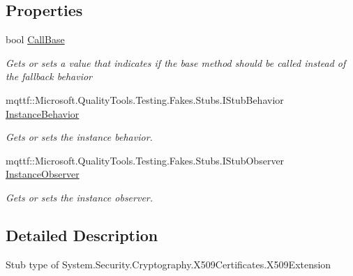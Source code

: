 \subsection*{Properties}
\begin{DoxyCompactItemize}
\item 
bool \hyperlink{class_system_1_1_security_1_1_cryptography_1_1_x509_certificates_1_1_fakes_1_1_stub_x509_extension_a73b4e3047842f780e43cd7a33bc94b4f}{Call\-Base}
\begin{DoxyCompactList}\small\item\em Gets or sets a value that indicates if the base method should be called instead of the fallback behavior\end{DoxyCompactList}\item 
mqttf\-::\-Microsoft.\-Quality\-Tools.\-Testing.\-Fakes.\-Stubs.\-I\-Stub\-Behavior \hyperlink{class_system_1_1_security_1_1_cryptography_1_1_x509_certificates_1_1_fakes_1_1_stub_x509_extension_ab302c65cf78e3fadf1862c6eda6de0cc}{Instance\-Behavior}
\begin{DoxyCompactList}\small\item\em Gets or sets the instance behavior.\end{DoxyCompactList}\item 
mqttf\-::\-Microsoft.\-Quality\-Tools.\-Testing.\-Fakes.\-Stubs.\-I\-Stub\-Observer \hyperlink{class_system_1_1_security_1_1_cryptography_1_1_x509_certificates_1_1_fakes_1_1_stub_x509_extension_a38baeb6a5fff8d1a8f5f1f84d4d07e5c}{Instance\-Observer}
\begin{DoxyCompactList}\small\item\em Gets or sets the instance observer.\end{DoxyCompactList}\end{DoxyCompactItemize}


\subsection{Detailed Description}
Stub type of System.\-Security.\-Cryptography.\-X509\-Certificates.\-X509\-Extension



